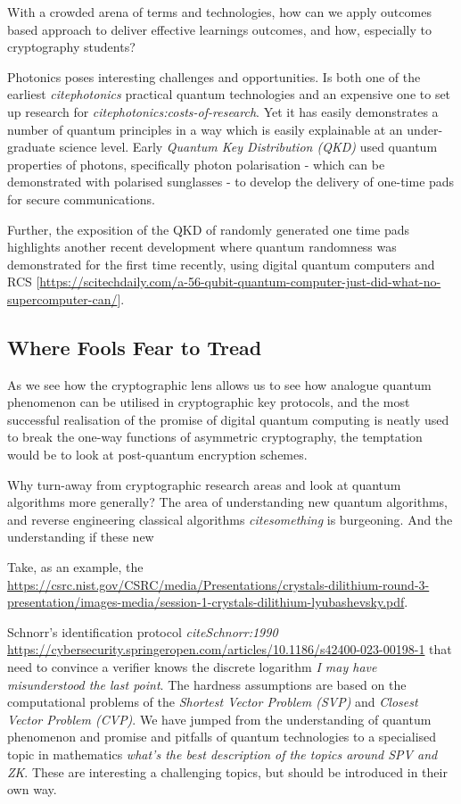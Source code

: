 With a crowded arena of terms and technologies, how can we apply outcomes based approach to deliver effective learnings outcomes,
and how, especially to cryptography students?

Photonics poses interesting challenges and opportunities. 
Is both one of the earliest \emph{cite{photonics}} practical quantum technologies 
and an expensive one to set up research for \emph{cite{photonics:costs-of-research}}. 
Yet it has easily demonstrates a number of quantum principles in a way which is easily explainable at an under-graduate science level.
Early \emph{Quantum Key Distribution (QKD)}   used quantum properties of photons, 
specifically photon polarisation - which can be demonstrated with polarised sunglasses - to develop the delivery of one-time pads 
for secure communications.


Further, the exposition of the QKD of randomly generated one time pads highlights another recent development
where quantum randomness was demonstrated for the first time recently, using digital quantum computers and RCS
[\href{google jpm 56 qubit QRNG}{https://scitechdaily.com/a-56-qubit-quantum-computer-just-did-what-no-supercomputer-can/}].


\subsection{Where Fools Fear to Tread}

As we see how the cryptographic lens allows us to see how analogue quantum phenomenon can be utilised in cryptographic key protocols,
and the most successful realisation of the promise of digital quantum computing is neatly used to break the one-way functions of asymmetric cryptography,
the temptation would be to look at post-quantum encryption schemes.  

Why turn-away from cryptographic research areas and look at quantum algorithms more generally?
The area of understanding new quantum algorithms, and reverse engineering classical algorithms \emph{cite{something}} is burgeoning.
And the understanding if these new 

Take, as an example, the \href{CRYSTAL-Dilithium NIST "Schnorr-like” lattice-based signature scheme}{https://csrc.nist.gov/CSRC/media/Presentations/crystals-dilithium-round-3-presentation/images-media/session-1-crystals-dilithium-lyubashevsky.pdf}.

Schnorr's identification protocol \emph{cite{Schnorr:1990}} \href{is an example a zero-knowledge protocol}{https://cybersecurity.springeropen.com/articles/10.1186/s42400-023-00198-1} 
that need to convince a verifier knows the discrete logarithm \emph{I may have misunderstood the last point}.
The hardness assumptions are based on the computational problems of the \emph{Shortest Vector Problem (SVP)} 
and \emph{Closest Vector Problem (CVP)}.  
We have jumped from the understanding of quantum phenomenon and promise and pitfalls of quantum technologies to
a specialised topic in mathematics \emph{what's the best description of the topics around SPV and ZK}.  
These are interesting a challenging topics, but should be introduced in their own way.

